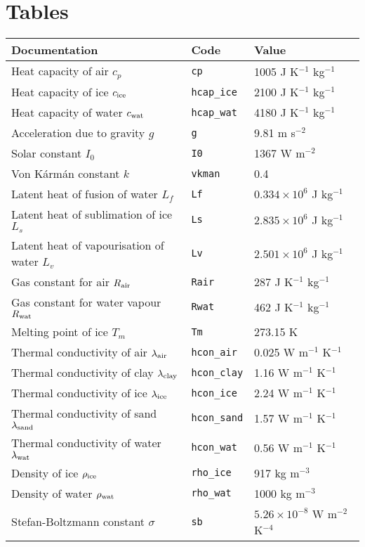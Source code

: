 \documentclass{article}
\begin{document}
\section*{Tables}
\parindent0pt
\begin{tabular}{|l|l|l|}
\hline
Documentation & Code & Value \\
\hline
Heat capacity of air $c_p$            & {\tt cp}        & 1005 J K$^{-1}$ kg$^{-1}$  \\
Heat capacity of ice $c_{\rm ice}$    & {\tt hcap\_ice} & 2100 J K$^{-1}$ kg$^{-1}$  \\
Heat capacity of water $c_{\rm wat}$  & {\tt hcap\_wat} & 4180 J K$^{-1}$ kg$^{-1}$  \\
Acceleration due to gravity $g$       & {\tt g}         & 9.81 m s$^{-2}$            \\
Solar constant $I_0$                  & {\tt I0}        & 1367 W m$^{-2}$            \\
Von K\'arm\'an constant $k$           & {\tt vkman}     & 0.4                        \\
Latent heat of fusion of water $L_f$  & {\tt Lf}        & $0.334 \times 10^6$ J kg$^{-1}$ \\
Latent heat of sublimation of ice $L_s$ & {\tt Ls}      & $2.835 \times 10^6$ J kg$^{-1}$ \\
Latent heat of vapourisation of water $L_v$ & {\tt Lv}  & $2.501 \times 10^6$ J kg$^{-1}$ \\
Gas constant for air $R_{\rm air}$    & {\tt Rair}      & 287 J K$^{-1}$ kg$^{-1}$   \\
Gas constant for water vapour $R_{\rm wat}$ & {\tt Rwat} & 462 J K$^{-1}$ kg$^{-1}$ \\
Melting point of ice $T_m$            & {\tt Tm}        & 273.15 K                  \\
Thermal conductivity of air $\lambda_{\rm air}$   & {\tt hcon\_air}  & 0.025 W m$^{-1}$ K$^{-1}$ \\
Thermal conductivity of clay $\lambda_{\rm clay}$ & {\tt hcon\_clay} & 1.16 W m$^{-1}$ K$^{-1}$ \\
Thermal conductivity of ice $\lambda_{\rm ice}$   & {\tt hcon\_ice}  & 2.24 W m$^{-1}$ K$^{-1}$ \\
Thermal conductivity of sand $\lambda_{\rm sand}$ & {\tt hcon\_sand} & 1.57 W m$^{-1}$ K$^{-1}$ \\
Thermal conductivity of water $\lambda_{\rm wat}$ & {\tt hcon\_wat}  & 0.56 W m$^{-1}$ K$^{-1}$ \\
Density of ice $\rho_{\rm ice}$ & {\tt rho\_ice} & 917 kg m$^{-3}$ \\
Density of water $\rho_{\rm wat}$ & {\tt rho\_wat} & 1000 kg m$^{-3}$ \\
Stefan-Boltzmann constant $\sigma$ & {\tt sb} & $5.26 \times 10^{-8}$ W m$^{-2}$ K$^{-4}$ \\
\hline 
\end{tabular}
\end{document}
